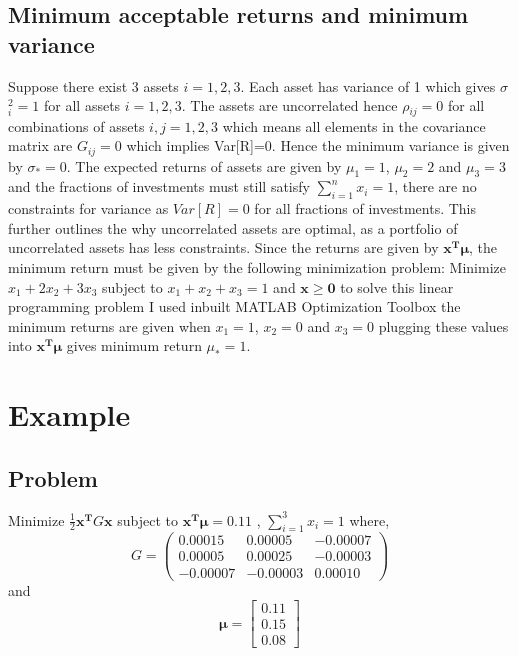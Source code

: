 \documentclass[11pt]{article}
\begin{document}
\subsection{Minimum acceptable returns and minimum variance}
Suppose there exist 3 assets $i=1,2,3$. Each asset has variance of 1 which gives $\sigma$$_i^2=1$ for all assets $i=1,2,3$. The assets are uncorrelated hence $\rho$$_{ij}=0$ for all combinations of assets $i,j=1,2,3$ which means all elements in the covariance matrix are $G_{ij}=0$ which implies Var[R]=0. Hence the minimum variance is given by $\sigma_*=0$. The expected returns of assets are given by $\mu_{1}=1$, $\mu_{2}=2$ and $\mu_{3}=3$ and the fractions of investments must still satisfy $\sum_{i=1}^{n}  x_{i}=1$, there are no constraints for variance as $Var[R]=0$ for all fractions of investments. This further outlines the why uncorrelated assets are optimal, as a portfolio of uncorrelated assets has less constraints. Since the returns are given by $\mathbf{x^T}\boldsymbol\mu $, the minimum return must be given by the following minimization problem:
\newline Minimize $x_1+2x_2+3x_3$ 
\newline subject to $x_1+x_2+x_3=1$ and $\mathbf{x} \geq \mathbf{0}$
\newline to solve this linear programming problem I used inbuilt MATLAB Optimization Toolbox\citep{MATLAB1} the minimum returns are given when $x_1=1$, $x_2=0$ and $x_3=0$ plugging these values into  $\mathbf{x^T}\boldsymbol\mu $ gives minimum return $\mu_*=1$. 
\section{Example}
\subsection{Problem}
Minimize
$\frac{1}{2} \mathbf{x^T}G\mathbf{x}$
\newline subject to
$\mathbf{x^T}  \boldsymbol\mu = 0.11$ , $\sum_{i=1}^{3}  x_{i}=1$
\newline where, 
\begin{equation*}
G=
\begin{pmatrix} 
0.00015 & 0.00005 & -0.00007\\
0.00005 & 0.00025 & -0.00003\\
-0.00007 & -0.00003 & 0.00010
\end{pmatrix}
\end{equation*}
and
\begin{equation*}
\boldsymbol\mu=
\begin{bmatrix} 
0.11\\
0.15\\
0.08
\end{bmatrix}
\end{equation*}
\end{document}
